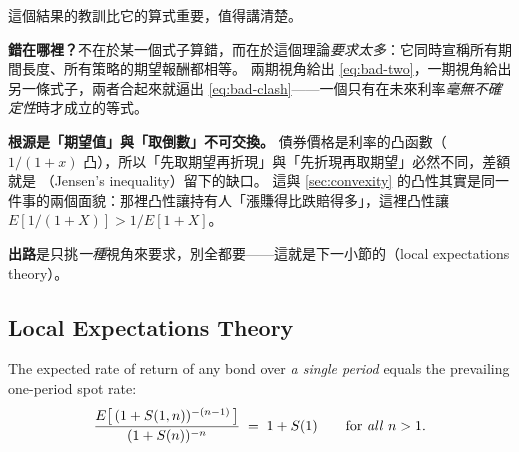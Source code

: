 \suppstart
\begin{remark}
	這個結果的教訓比它的算式重要，值得講清楚。

	\textbf{錯在哪裡？}不在於某一個式子算錯，而在於這個理論\emph{要求太多}：它同時宣稱所有期間長度、所有策略的期望報酬都相等。
	兩期視角給出 \eqref{eq:bad-two}，一期視角給出另一條式子，兩者合起來就逼出 \eqref{eq:bad-clash}——一個只有在未來利率\emph{毫無不確定性}時才成立的等式。

	\textbf{根源是「期望值」與「取倒數」不可交換。}
	債券價格是利率的凸函數（$1/(1+x)$ 凸），所以「先取期望再折現」與「先折現再取期望」必然不同，差額就是 （Jensen's inequality）留下的缺口。
	這與 \autoref{sec:convexity} 的凸性其實是同一件事的兩個面貌：那裡凸性讓持有人「漲賺得比跌賠得多」，這裡凸性讓 $E[1/(1+X)] > 1/E[1+X]$。

	\textbf{出路}是只挑\emph{一種}視角來要求，別全都要——這就是下一小節的（local expectations theory）。
\end{remark}
\suppend

\subsection{Local Expectations Theory}


\begin{theorem}
	The expected rate of return of any bond over \emph{a single period} equals the prevailing one-period spot rate:
	\begin{equation}
		\frac{E\bigl[\,(1+S(1,n))^{-(n-1)}\,\bigr]}{(1+S(n))^{-n}} \;=\; 1+S(1)
		\qquad \text{for \emph{all} } n>1 . \label{eq:let}
	\end{equation}
\end{theorem}

